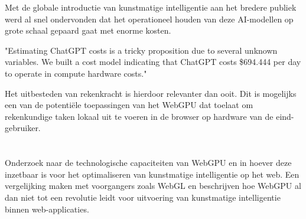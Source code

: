 Met de globale introductie van kunstmatige intelligentie aan het bredere publiek werd al snel ondervonden dat het operationeel houden van deze AI-modellen op grote schaal gepaard gaat met enorme kosten. \autocite{Patel2023}

\begin{displayquote}
    "Estimating ChatGPT costs is a tricky proposition due to several unknown variables. We built a cost model indicating that ChatGPT costs \$694.444 per day to operate in compute hardware costs."
\end{displayquote}

\bigbreak{}

Het uitbesteden van rekenkracht is hierdoor relevanter dan ooit. Dit is mogelijks een van de potentiële toepassingen van het WebGPU dat toelaat om rekenkundige taken lokaal uit te voeren in de browser op hardware van de eind-gebruiker.

\section{}%
\label{sec:onderzoeksvraag}




\section{}%
\label{sec:onderzoeksdoelstelling}


Onderzoek naar de technologische capaciteiten van WebGPU en in hoever deze inzetbaar is voor het optimaliseren van kunstmatige intelligentie op het web. Een vergelijking maken met voorgangers zoals WebGL en beschrijven hoe WebGPU al dan niet tot een revolutie leidt voor uitvoering van kunstmatige intelligentie binnen web-applicaties.

